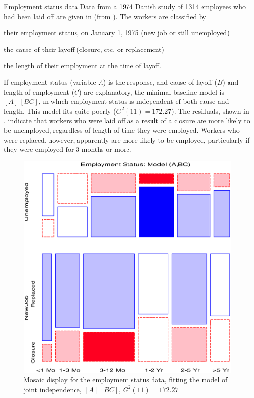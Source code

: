 \begin{Example}[employ]{Employment status data}
Data from a 1974 Danish study of 1314 employees who had been laid off are given in  (from \citet[Table 5.12]{Andersen:91}).
The workers are classified by
\begin{seriate}
\item their employment status, on January 1, 1975 (new job or still unemployed)
\item the cause of their layoff (closure, etc. or replacement)
\item the length of their employment at the time of layoff.
\end{seriate}



If employment status (variable $A$) is the response, and cause of layoff ($B$)
and length of employment ($C$) are explanatory, the minimal baseline model
is \([A] \,  [BC] \), in which employment status is independent of both
cause and length.
This model fits quite poorly (\(G^2 (11) = 172.27\)).
The residuals, shown in ,
indicate that workers who were laid off as a result of a closure
are more likely to be unemployed, regardless of length of time
they were employed.
Workers who were replaced, however, apparently are more likely
to be employed, particularly if they were employed for 3 months or more.
\begin{figure}[htb]
  \centering
  \includegraphics[scale=.6]{ch4/fig/mosaic141}
  \caption[Employment status data, joint independence]{Mosaic display for the employment status data, fitting the model of
joint independence, \([A] \,  [BC] \), \(G^2 (11) = 172.27\)}
  \label{fig:mosaic141} 
\end{figure}


\end{Example}
